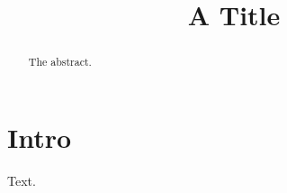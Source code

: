 \documentclass{IEEEtran4PSCC}
\begin{document}
\title{A Title}
\author{}
\maketitle
\begin{abstract}
The abstract.
\end{abstract}
\section{Intro}
Text.
\end{document}
